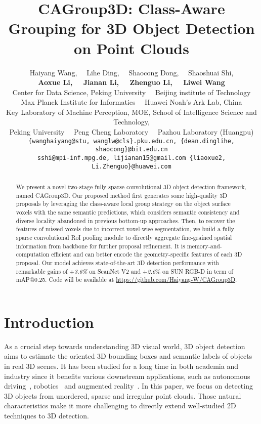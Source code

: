 \documentclass{article}
\title{CAGroup3D: Class-Aware Grouping for 3D Object Detection on Point Clouds}
\author{Haiyang Wang\footnotemark[1], ~~Lihe Ding\footnotemark[1], ~~Shaocong Dong, ~~Shaoshuai Shi\footnotemark[2], \\
  \textbf{Aoxue Li, ~~Jianan Li, ~~Zhenguo Li, ~~Liwei Wang\footnotemark[2]} \\
  {}Center for Data Science, Peking University ~~{}Beijing institute of Technology \\
  {}Max Planck Institute for Informatics ~~{}Huawei Noah’s Ark Lab, China\\
  {}Key Laboratory of Machine Perception, MOE, School of Intelligence Science and Technology, \\
  Peking University ~~{}Peng Cheng Laboratory ~~{}Pazhou Laboratory (Huangpu) \\
  {\tt\small\{wanghaiyang@stu, wanglw@cls\}.pku.edu.cn, \{dean.dinglihe, shaocong\}@bit.edu.cn}\\
  {\tt\small sshi@mpi-inf.mpg.de, lijianan15@gmail.com \{liaoxue2, Li.Zhenguo\}@huawei.com}\\
}
\begin{document}
\maketitle
\renewcommand{\thefootnote}{\fnsymbol{footnote}}
\begin{abstract}
We present a novel two-stage fully sparse convolutional 3D object detection framework, named CAGroup3D. Our proposed method first generates some high-quality 3D proposals by leveraging the class-aware local group strategy on the object surface voxels with the same semantic predictions, which considers semantic consistency and diverse locality abandoned in previous bottom-up approaches. Then, to recover the features of missed voxels due to incorrect voxel-wise segmentation, we build a fully sparse convolutional RoI pooling module to directly aggregate fine-grained spatial information from backbone for further proposal refinement. It is memory-and-computation efficient and can better encode the geometry-specific features of each 3D proposal. Our model achieves state-of-the-art 3D detection performance with remarkable gains of +\textit{3.6\%} on ScanNet V2 and +\textit{2.6}\%  on SUN RGB-D in term of mAP@0.25. Code will be available at \url{https://github.com/Haiyang-W/CAGroup3D}.
\end{abstract}
\section{Introduction}
As a crucial step towards understanding 3D visual world, 3D object detection aims to estimate the oriented 3D bounding boxes and semantic labels of objects in real 3D scenes. It has been studied for a long time in both academia and industry 
since it benefits various downstream applications, such as autonomous driving~\cite{bansal2018chauffeurnet,wang2019monocular}, robotics~\cite{zhu2017target,wang2021collaborative} and augmented reality~\cite{azuma1997survey,billinghurst2015survey}. In this paper, we focus on detecting 3D objects from unordered, sparse and irregular point clouds. Those natural characteristics make it more challenging to directly extend well-studied 2D techniques to 3D detection.
\end{document}
